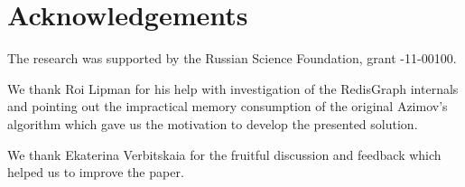 \documentclass[sigconf,edbt,table]{acmart-edbt2021}
\begin{document}

\maketitle





%


\section*{Acknowledgements}
The research was supported by the Russian Science Foundation, grant -11-00100.

We thank Roi Lipman for his help with investigation of the RedisGraph internals and pointing out the impractical memory consumption of the original Azimov's algorithm which gave us the motivation to develop the presented solution.

We thank Ekaterina Verbitskaia for the fruitful discussion and feedback which helped us to improve the paper.


\balance




%
\end{document}
